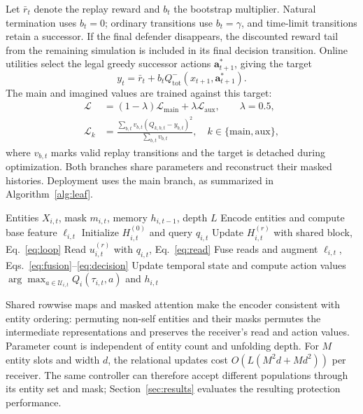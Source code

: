 Let $\bar r_t$ denote the replay reward and $b_t$ the bootstrap multiplier. Natural termination uses $b_t=0$; ordinary transitions use $b_t=\gamma$, and time-limit transitions retain a successor. If the final defender disappears, the discounted reward tail from the remaining simulation is included in its final decision transition. Online utilities select the legal greedy successor actions $\boldsymbol a^*_{t+1}$, giving the target
\begin{equation}
 y_t=\bar r_t+b_t Q^-_{\mathrm{tot}}(x_{t+1},\boldsymbol a^*_{t+1}).
 \label{eq:td-target}
\end{equation}
The main and imagined values are trained against this target:
\begin{align}
 \mathcal L&=(1-\lambda)\mathcal L_{\mathrm{main}}
                  +\lambda\mathcal L_{\mathrm{aux}},\qquad\lambda=0.5,\nonumber\\
 \mathcal L_k&=\frac{\sum_{b,t} v_{b,t}(Q_{k,b,t}-y_{b,t})^2}
 {\sum_{b,t}v_{b,t}},\quad k\in\{\mathrm{main},\mathrm{aux}\},
 \label{eq:td-loss}
\end{align}
where $v_{b,t}$ marks valid replay transitions and the target is detached during optimization. Both branches share parameters and reconstruct their masked histories. Deployment uses the main branch, as summarized in Algorithm~\ref{alg:leaf}.

\begin{algorithm}[!t]
\caption{LEAF at one defender decision}
\label{alg:leaf}
\begin{algorithmic}[1]
\Require Entities $X_{i,t}$, mask $m_{i,t}$, memory $h_{i,t-1}$, depth $L$
\State Encode entities and compute base feature $\ell_{i,t}$
\State Initialize $H^{(0)}_{i,t}$ and query $q_{i,t}$
\State Update $H^{(r)}_{i,t}$ with shared block, Eq.~\eqref{eq:loop}
\State Read $u^{(r)}_{i,t}$ with $q_{i,t}$, Eq.~\eqref{eq:read}
\EndFor
\State Fuse reads and augment $\ell_{i,t}$, Eqs.~\eqref{eq:fusion}--\eqref{eq:decision}
\State Update temporal state and compute action values
\State \Return $\arg\max_{a\in\mathcal U_{i,t}}Q_i(\tau_{i,t},a)$ and $h_{i,t}$
\end{algorithmic}
\end{algorithm}

Shared rowwise maps and masked attention make the encoder consistent with entity ordering: permuting non-self entities and their masks permutes the intermediate representations and preserves the receiver's read and action values. Parameter count is independent of entity count and unfolding depth. For $M$ entity slots and width $d$, the relational updates cost $O(L(M^2d+Md^2))$ per receiver. The same controller can therefore accept different populations through its entity set and mask; Section~\ref{sec:results} evaluates the resulting protection performance.
